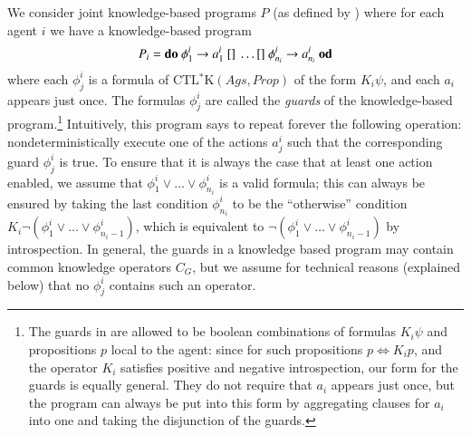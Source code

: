 \documentclass[a4wide]{article}
\newcommand{\CTLsK}{\mbox{CTL$^*$K}}
\newcommand{\Prop}{Prop}
\newcommand{\dimp}{\Leftrightarrow}
\theoremstyle{examplesty}
\newcommand{\Ags}{\mathit{Ags}}
\begin{document}
We consider joint knowledge-based programs $P$ (as defined by \cite{FHMV1997}) where for each 
agent $i$ we have a knowledge-based program 
$$P_i = {\bf do} ~\phi^i_1 \rightarrow a^i_1~ [] ~ \ldots [] ~\phi^i_{n_i } \rightarrow a^i_{n_i}~{\bf od}$$
where each $\phi^i_j$ is a formula of $\CTLsK(\Ags, \Prop)$ of the form $K_i \psi$, and each $a_i$ appears just once.
The formulas $\phi^i_j$ are called the \emph{guards} of the knowledge-based program.\footnote{The guards in 
\cite{FHMV1997} are allowed to be boolean combinations of formulas $K_i \psi$ and propositions $p$ local to the agent: 
since for such propositions $p \dimp K_ip$, 
and the operator $K_i$ satisfies positive and negative introspection, our form for the guards is equally general. 
They do not require that $a_i$ appears just once, but the program can always be put into this 
form by aggregating clauses for $a_i$ into one and taking the disjunction of the guards.} 
Intuitively, this program says to repeat forever the following operation: nondeterministically execute one of the 
actions $a^i_j$ such that the corresponding guard $\phi^i_j$ is true. To ensure that 
it is always the case that at least one action enabled, we assume that $\phi^i_1 \lor \ldots \lor \phi^i_{n_i }$ 
is a valid formula; this can always be ensured by taking the last condition $\phi^i_{n_i }$ to be 
the ``otherwise'' condition $K_i \neg (\phi^i_1 \lor \ldots \lor \phi^i_{n_i -1})$, which is equivalent to 
$\neg( \phi^i_1 \lor \ldots \lor \phi^i_{n_i -1})$ by introspection. 
In general,  the guards in a knowledge based program may contain common knowledge 
operators $C_G$, but we assume for technical reasons (explained below) that no $\phi^i_j$ contains 
such an operator.  
\end{document}
